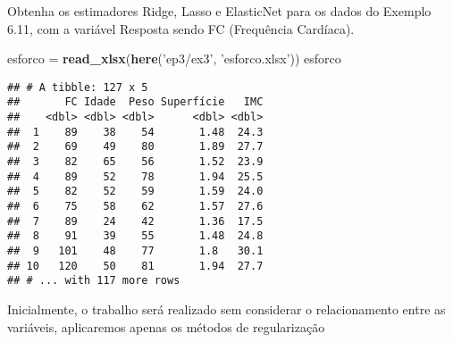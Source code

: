 \documentclass[]{article}
\newenvironment{Shaded}{\begin{snugshade}}{\end{snugshade}}
\newcommand{\KeywordTok}[1]{\textcolor[rgb]{0.13,0.29,0.53}{\textbf{#1}}}
\newcommand{\NormalTok}[1]{#1}
\newcommand{\StringTok}[1]{\textcolor[rgb]{0.31,0.60,0.02}{#1}}
\begin{document}
Obtenha os estimadores Ridge, Lasso e ElasticNet para os dados do
Exemplo 6.11, com a variável Resposta sendo FC (Frequência Cardíaca).

\begin{Shaded}
\begin{Highlighting}[]
\NormalTok{esforco =}\StringTok{ }\KeywordTok{read_xlsx}\NormalTok{(}\KeywordTok{here}\NormalTok{(}\StringTok{'ep3/ex3'}\NormalTok{, }\StringTok{'esforco.xlsx'}\NormalTok{))}
\NormalTok{esforco}
\end{Highlighting}
\end{Shaded}

\begin{verbatim}
## # A tibble: 127 x 5
##       FC Idade  Peso Superfície   IMC
##    <dbl> <dbl> <dbl>      <dbl> <dbl>
##  1    89    38    54       1.48  24.3
##  2    69    49    80       1.89  27.7
##  3    82    65    56       1.52  23.9
##  4    89    52    78       1.94  25.5
##  5    82    52    59       1.59  24.0
##  6    75    58    62       1.57  27.6
##  7    89    24    42       1.36  17.5
##  8    91    39    55       1.48  24.8
##  9   101    48    77       1.8   30.1
## 10   120    50    81       1.94  27.7
## # ... with 117 more rows
\end{verbatim}

Inicialmente, o trabalho será realizado sem considerar o relacionamento
entre as variáveis, aplicaremos apenas os métodos de regularização
\end{document}
